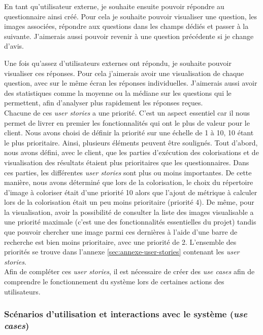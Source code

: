 \documentclass{article}
\begin{document}
En tant qu'utilisateur externe, je souhaite ensuite pouvoir répondre au questionnaire ainsi créé.
Pour cela je souhaite pouvoir visualiser une question, les images associées, répondre aux questions dans les champs dédiés et passer à la suivante.
J'aimerais aussi pouvoir revenir à une question précédente si je change d'avis.

Une fois qu'assez d'utilisateurs externes ont répondu, je souhaite pouvoir visualiser ces réponses. Pour cela j'aimerais avoir une visualisation de chaque question, avec sur le même écran les réponses individuelles. 
J'aimerais aussi avoir des statistiques comme la moyenne ou la médiane sur les questions qui le permettent, afin d'analyser plus rapidement les réponses reçues.\\

Chacune de ces \textit{user stories} a une priorité. C'est un aspect essentiel car il nous permet de livrer en premier les fonctionnalités qui ont le plus de valeur pour le client.
Nous avons choisi de définir la priorité sur une échelle de 1 à 10, 10 étant le plus prioritaire.
Ainsi, plusieurs éléments peuvent être soulignés. Tout d'abord, nous avons défini, avec le client, que les parties d'exécution des colorisations et de visualisation
des résultats étaient plus prioritaires que les questionnaires. Dans ces parties, les différentes \textit{user stories} sont plus ou moins importantes.
De cette manière, nous avons déterminé que lors de la colorisation, le choix du répertoire d'image à coloriser était d'une priorité 10 alors que 
l'ajout de métrique à calculer lors de la colorisation était un peu moins prioritaire (priorité 4).
De même, pour la visualisation, avoir la possibilité de consulter la liste des images visualisable a une priorité maximale (c'est une des fonctionnalités essentielles du projet) tandis que pouvoir chercher une image parmi ces dernières
à l'aide d'une barre de recherche est bien moins prioritaire, avec une priorité de 2.
L'ensemble des priorités se trouve dans l'annexe \ref{sec:annexe-user-stories} contenant les \textit{user stories}.\\

Afin de compléter ces \textit{user stories}, il est nécessaire de créer des \textit{use cases}
afin de comprendre le fonctionnement du système lors de certaines actions des utilisateurs.

\subsubsection{Scénarios d'utilisation et interactions avec le système (\textit{use cases})} \label{sec:usecase}
\end{document}
